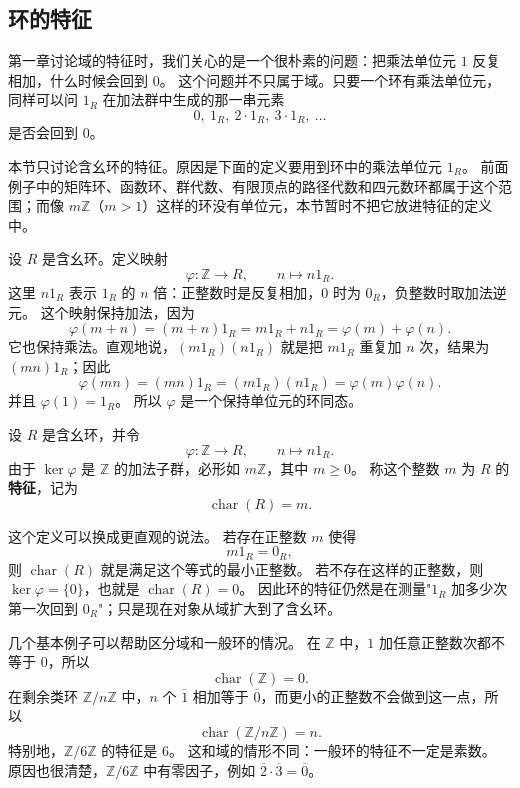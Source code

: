\subsection{环的特征}\label{sec:ring-characteristic}

第一章讨论域的特征时，我们关心的是一个很朴素的问题：把乘法单位元 $1$ 反复相加，什么时候会回到 $0$。
这个问题并不只属于域。只要一个环有乘法单位元，同样可以问 $1_R$ 在加法群中生成的那一串元素
\[
0,\ 1_R,\ 2\cdot 1_R,\ 3\cdot 1_R,\ \ldots
\]
是否会回到 $0$。

本节只讨论含幺环的特征。原因是下面的定义要用到环中的乘法单位元 $1_R$。
前面例子中的矩阵环、函数环、群代数、有限顶点的路径代数和四元数环都属于这个范围；而像 $m\mathbb Z$（$m>1$）这样的环没有单位元，本节暂时不把它放进特征的定义中。

设 $R$ 是含幺环。定义映射
\[
\varphi:\mathbb Z\to R,\qquad n\mapsto n1_R.
\]
这里 $n1_R$ 表示 $1_R$ 的 $n$ 倍：正整数时是反复相加，$0$ 时为 $0_R$，负整数时取加法逆元。
这个映射保持加法，因为
\[
\varphi(m+n)=(m+n)1_R=m1_R+n1_R=\varphi(m)+\varphi(n).
\]
它也保持乘法。直观地说，$(m1_R)(n1_R)$ 就是把 $m1_R$ 重复加 $n$ 次，结果为 $(mn)1_R$；因此
\[
\varphi(mn)=(mn)1_R=(m1_R)(n1_R)=\varphi(m)\varphi(n).
\]
并且 $\varphi(1)=1_R$。
所以 $\varphi$ 是一个保持单位元的环同态。

\begin{definition}[含幺环的特征]\label{def:ring-characteristic}
设 $R$ 是含幺环，并令
\[
\varphi:\mathbb Z\to R,\qquad n\mapsto n1_R.
\]
由于 $\ker\varphi$ 是 $\mathbb Z$ 的加法子群，必形如 $m\mathbb Z$，其中 $m\geq0$。
称这个整数 $m$ 为 $R$ 的\textbf{特征}，记为
\[
\operatorname{char}(R)=m.
\]
\end{definition}

这个定义可以换成更直观的说法。
若存在正整数 $m$ 使得
\[
m1_R=0_R,
\]
则 $\operatorname{char}(R)$ 就是满足这个等式的最小正整数。
若不存在这样的正整数，则 $\ker\varphi=\{0\}$，也就是 $\operatorname{char}(R)=0$。
因此环的特征仍然是在测量"$1_R$ 加多少次第一次回到 $0_R$"；只是现在对象从域扩大到了含幺环。

几个基本例子可以帮助区分域和一般环的情况。
在 $\mathbb Z$ 中，$1$ 加任意正整数次都不等于 $0$，所以
\[
\operatorname{char}(\mathbb Z)=0.
\]
在剩余类环 $\mathbb Z/n\mathbb Z$ 中，$n$ 个 $\overline{1}$ 相加等于 $\overline{0}$，而更小的正整数不会做到这一点，所以
\[
\operatorname{char}(\mathbb Z/n\mathbb Z)=n.
\]
特别地，$\mathbb Z/6\mathbb Z$ 的特征是 $6$。
这和域的情形不同：一般环的特征不一定是素数。
原因也很清楚，$\mathbb Z/6\mathbb Z$ 中有零因子，例如 $\overline2\cdot\overline3=\overline0$。

